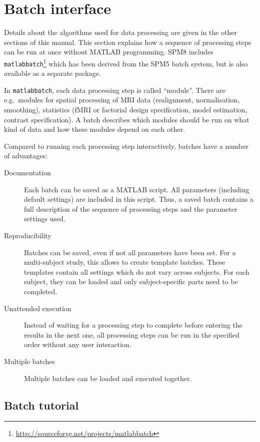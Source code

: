 \chapter{Batch interface \label{Chap:batch_interface}}

Details about the algorithms used for data processing are given in the other
sections of this manual. This section explains how a sequence of processing
steps can be run at once without MATLAB programming. SPM8 includes
\texttt{matlabbatch}\footnote{\url{http://sourceforge.net/projects/matlabbatch}} which has been derived from the SPM5
batch system, but is also available as a separate package.

In \texttt{matlabbatch}, each data processing step is called ``module''. There
are e.g.\ modules for spatial processing of MRI data (realignment,
normalisation, smoothing), statistics (fMRI or factorial design specification,
model estimation, contrast specification). A batch describes which modules
should be run on what kind of data and how these modules depend on each other.

Compared to running each processing step interactively, batches have a number
of advantages:
\begin{description}
\item[Documentation] Each batch can be saved as a MATLAB script. All
  parameters (including default settings) are included in this script. Thus, a
  saved batch contains a full description of the sequence of processing steps
  and the parameter settings used.
\item[Reproducibility] Batches can be saved, even if not all parameters have
  been set. For a multi-subject study, this allows to create template batches.
  These templates contain all settings which do not vary across subjects. For
  each subject, they can be loaded and only subject-specific parts need to be
  completed.
\item[Unattended execution] Instead of waiting for a processing step to
  complete before entering the results in the next one, all processing steps
  can be run in the specified order without any user interaction.
\item[Multiple batches] Multiple batches can be loaded and executed together.
\end{description}

\section{Batch tutorial}

